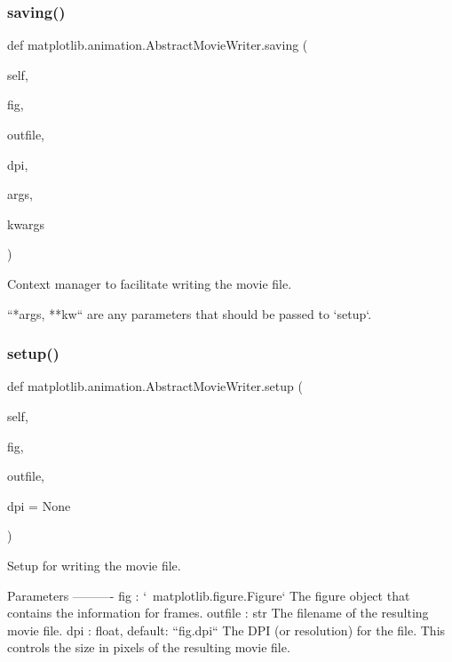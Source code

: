 \subsubsection{\texorpdfstring{saving()}{saving()}}
{\footnotesize\ttfamily def matplotlib.\+animation.\+Abstract\+Movie\+Writer.\+saving (\begin{DoxyParamCaption}\item[{}]{self,  }\item[{}]{fig,  }\item[{}]{outfile,  }\item[{}]{dpi,  }\item[{}]{args,  }\item[{}]{kwargs }\end{DoxyParamCaption})}

\begin{DoxyVerb}Context manager to facilitate writing the movie file.

``*args, **kw`` are any parameters that should be passed to `setup`.
\end{DoxyVerb}
 \mbox{\label{classmatplotlib_1_1animation_1_1AbstractMovieWriter_ac9a9c1598d0a28907b4501abc3831fc7}} 
\subsubsection{\texorpdfstring{setup()}{setup()}}
{\footnotesize\ttfamily def matplotlib.\+animation.\+Abstract\+Movie\+Writer.\+setup (\begin{DoxyParamCaption}\item[{}]{self,  }\item[{}]{fig,  }\item[{}]{outfile,  }\item[{}]{dpi = {\ttfamily None} }\end{DoxyParamCaption})}

\begin{DoxyVerb}Setup for writing the movie file.

Parameters
----------
fig : `~matplotlib.figure.Figure`
    The figure object that contains the information for frames.
outfile : str
    The filename of the resulting movie file.
dpi : float, default: ``fig.dpi``
    The DPI (or resolution) for the file.  This controls the size
    in pixels of the resulting movie file.
\end{DoxyVerb}
 


